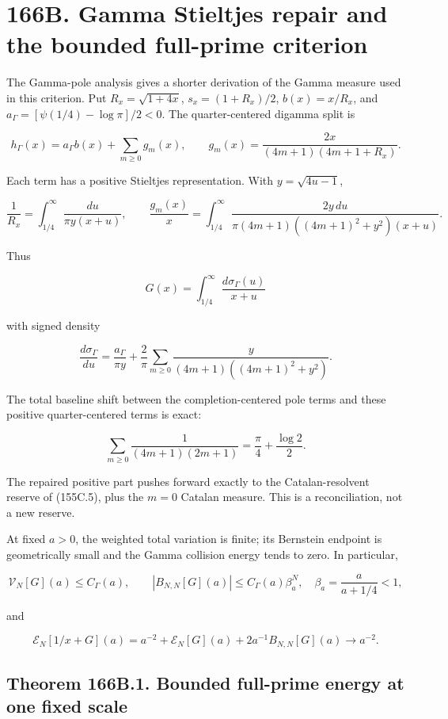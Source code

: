 \documentclass[
  11pt,
]{book}
\begin{document}
\section{166B. Gamma Stieltjes repair and the bounded full-prime
criterion}\label{b.-gamma-stieltjes-repair-and-the-bounded-full-prime-criterion}

The Gamma-pole analysis gives a shorter derivation of the Gamma measure
used in this criterion. Put \(R_x=\sqrt{1+4x}\), \(s_x=(1+R_x)/2\),
\(b(x)=x/R_x\), and \(a_\Gamma=[\psi(1/4)-\log\pi]/2<0\). The
quarter-centered digamma split is

\[
\boxed{h_\Gamma(x)=a_\Gamma b(x)+\sum_{m\ge0}g_m(x),
\qquad
g_m(x)=\frac{2x}{(4m+1)(4m+1+R_x)}.}
\tag{166B.1}
\]

Each term has a positive Stieltjes representation. With
\(y=\sqrt{4u-1}\),

\[
\frac1{R_x}=\int_{1/4}^\infty\frac{du}{\pi y(x+u)},\qquad
\frac{g_m(x)}x=\int_{1/4}^\infty
\frac{2y\,du}{\pi(4m+1)((4m+1)^2+y^2)(x+u)}.
\tag{166B.2}
\]

Thus

\[
\boxed{G(x)=\int_{1/4}^\infty\frac{d\sigma_\Gamma(u)}{x+u}}
\tag{166B.3}
\]

with signed density

\[
\frac{d\sigma_\Gamma}{du}
=\frac{a_\Gamma}{\pi y}
+\frac2\pi\sum_{m\ge0}
\frac{y}{(4m+1)((4m+1)^2+y^2)}.
\tag{166B.4}
\]

The total baseline shift between the completion-centered pole terms and
these positive quarter-centered terms is exact:

\[
\sum_{m\ge0}\frac1{(4m+1)(2m+1)}
=\frac\pi4+\frac{\log2}{2}.
\tag{166B.4a}
\]

The repaired positive part pushes forward exactly to the
Catalan-resolvent reserve of (155C.5), plus the \(m=0\) Catalan measure.
This is a reconciliation, not a new reserve.

At fixed \(a>0\), the weighted total variation is finite; its Bernstein
endpoint is geometrically small and the Gamma collision energy tends to
zero. In particular,

\[
\mathcal V_N[G](a)\le C_\Gamma(a),\qquad
|B_{N,N}[G](a)|\le C_\Gamma(a)\beta_a^N,
\quad \beta_a=\frac{a}{a+1/4}<1,
\tag{166B.7}
\]

and

\[
\mathscr E_N[1/x+G](a)
=a^{-2}+\mathscr E_N[G](a)+2a^{-1}B_{N,N}[G](a)
\longrightarrow a^{-2}.
\tag{166B.8}
\]

\subsection{Theorem 166B.1. Bounded full-prime energy at one fixed
scale}\label{theorem-166b.1.-bounded-full-prime-energy-at-one-fixed-scale}
\end{document}
